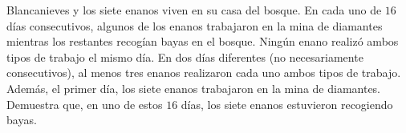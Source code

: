 Blancanieves y los siete enanos viven en su casa del bosque. En cada uno de $16$ días consecutivos, algunos de los enanos trabajaron en la mina de diamantes mientras los restantes recogían bayas en el bosque. Ningún enano realizó ambos tipos de trabajo el mismo día. En dos días diferentes (no necesariamente consecutivos), al menos tres enanos realizaron cada uno ambos tipos de trabajo. Además, el primer día, los siete enanos trabajaron en la mina de diamantes. Demuestra que, en uno de estos $16$ días, los siete enanos estuvieron recogiendo bayas.